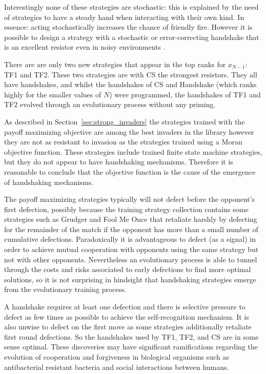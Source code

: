 \documentclass{article}
\begin{document}
Interestingly none of these strategies are stochastic: this is explained by
the need of strategies to have a steady hand when interacting with their own
kind. In essence: acting stochastically increases the chance of friendly fire.
However it is possible to design a strategy with a stochastic or error-correcting
handshake that is an excellent resistor even in noisy environments \cite{Lee2015}.

There are are only two new strategies that appear in the top ranks for
\(x_{N-1}\): TF1 and TF2. These two strategies are with CS the strongest
resistors. They all have handshakes, and whilst the handshakes of CS and
Handshake (which ranks highly for the smaller values of \(N\)) were
programmed, the handshakes of TF1 and TF2 evolved through an evolutionary
process without any priming.

As described in Section~\ref{sec:strong_invaders} the strategies trained with
the payoff maximizing objective are among the best invaders in the library
however they are not as resistant to invasion as the strategies trained using a
Moran objective function. These strategies include trained finite state machine
strategies, but they do not appear to have handshaking mechanisms. Therefore it
is reasonable to conclude that the objective function is the cause of the
emergence of handshaking mechanisms.

The payoff maximizing strategies typically will not defect before the opponent's
first defection, possibly because the training strategy collection contains some
strategies such as Grudger and Fool Me Once that retaliate harshly by defecting
for the remainder of the match if the opponent has more than a small number of
cumulative defections. Paradoxically it is advantageous to defect (as a signal)
in order to achieve mutual cooperation with opponents using the same strategy
but not with other opponents. Nevertheless an evolutionary process is able to
tunnel through the costs and risks associated to early defections to find more
optimal solutions, so it is not surprising in hindsight that handshaking
strategies emerge from the evolutionary training process.

A handshake requires at least one defection and there is
selective pressure to defect as few times as possible to achieve the
self-recognition mechanism. It is also unwise to defect on the first move as
some strategies additionally retaliate first round defections. So the
handshakes used by TF1, TF2, and CS are in some sense optimal. These
discoveries may have significant ramifications regarding the evolution of
cooperation and forgiveness in biological organisms such as antibacterial
resistant bacteria and social interactions between humans.
\end{document}
